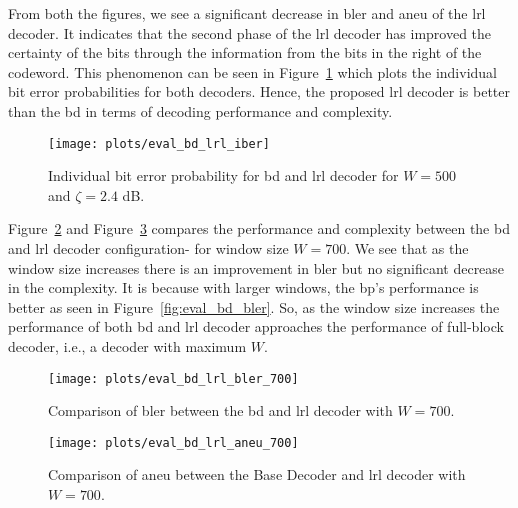 From both the figures, we see a significant decrease in \gls{bler} and \gls{aneu} of the \gls{lrl} decoder. It indicates that the second phase of the \gls{lrl} decoder has improved the certainty of the bits through the information from the bits in the right of the codeword. This phenomenon can be seen in Figure~\ref{fig:eval_bd_lrl_iber} which plots the individual bit error probabilities for both decoders. Hence, the proposed \gls{lrl} decoder is better than the \gls{bd} in terms of decoding performance and complexity.
\begin{figure}[htbp]
  \centering
  \texttt{[image: plots/eval\_bd\_lrl\_iber]}
  \caption[Individual \acrshort{ber} of \acrshort{bd} and \acrshort{lrl}.]{Individual bit error probability for \gls{bd} and \gls{lrl} decoder for $W=500$ and $\zeta=2.4$ dB.}
  \label{fig:eval_bd_lrl_iber}
\end{figure}

Figure~\ref{fig:eval_bd_lrl_bler_700} and Figure~\ref{fig:eval_bd_lrl_aneu_700} compares the performance and complexity between the \gls{bd} and \gls{lrl} decoder configuration- for window size $W=700$. We see that as the window size increases there is an improvement in \gls{bler} but no significant decrease in the complexity. It is because with larger windows, the \gls{bp}'s performance is better as seen in Figure~\ref{fig:eval_bd_bler}. So, as the window size increases the performance of both \gls{bd} and \gls{lrl} decoder approaches the performance of full-block decoder, i.e., a decoder with maximum $W$.
\begin{figure}[htbp]
  \centering
  \texttt{[image: plots/eval\_bd\_lrl\_bler\_700]}
  \caption[Comparison of \acrshort{bler} between the \acrshort{bd} and \acrshort{lrl} decoder with $W=700$]{Comparison of \gls{bler} between the \gls{bd} and \gls{lrl} decoder with $W=700$.}
  \label{fig:eval_bd_lrl_bler_700}
\end{figure}
\begin{figure}[htbp]
  \centering
  \texttt{[image: plots/eval\_bd\_lrl\_aneu\_700]}
  \caption[Comparison of \acrshort{aneu} between the \acrshort{bd} and \acrshort{lrl} decoder with $W=700$.]{Comparison of \gls{aneu} between the Base Decoder and \gls{lrl} decoder with $W=700$.}
  \label{fig:eval_bd_lrl_aneu_700}
\end{figure}

